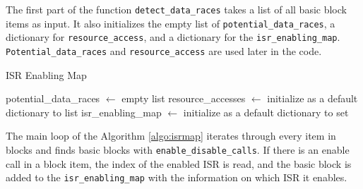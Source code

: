 \documentclass[
fancyheadings, %
%
%
]{stsreprt}
\begin{document}
{The first part of the function \texttt{detect\_data\_races} takes a list of all basic block items as input. It also initializes the empty list of \texttt{potential\_data\_races}, a dictionary for \texttt{resource\_access}, and a dictionary for the \texttt{isr\_enabling\_map}. \texttt{Potential\_data\_races} and \texttt{resource\_access} are used later in the code.

\begin{algorithm}[H]
	\caption{ISR Enabling Map}
	\label{algo:isrmap}
	\DontPrintSemicolon
	\SetAlgoLined
	\BlankLine
	potential\_data\_races $\gets$ empty list\;
	resource\_accesses $\gets$ initialize as a default dictionary to list\;
	isr\_enabling\_map $\gets$ initialize as a default dictionary to set\;
	\BlankLine
\end{algorithm}

\vspace{1cm}
The main loop of the Algorithm \ref{algo:isrmap} iterates through every item in blocks and finds basic blocks with \texttt{enable\_disable\_calls}. If there is an enable call in a block item, the index of the enabled \ac{ISR} is read, and the basic block is added to the \texttt{isr\_enabling\_map} with the information on which \ac{ISR} it enables.

}
\end{document}
